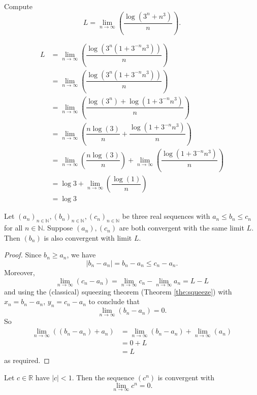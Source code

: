 \begin{example}
    Compute \[L=\lim_{n\to\infty}\left(\dfrac{\log(3^n+n^3)}{n}\right).\]
    
    \begin{align*}
        L&=\lim_{n\to\infty}\left(\dfrac{\log(3^n(1+3^{-n}n^3))}{n}\right)\\
        &=\lim_{n\to\infty}\left(\dfrac{\log(3^n(1+3^{-n}n^3))}{n}\right)\\
        &=\lim_{n\to\infty}\left(\dfrac{\log(3^n)+\log(1+3^{-n}n^3)}{n}\right)\\
        &=\lim_{n\to\infty}\left(\dfrac{n\log(3)}{n}+\dfrac{\log(1+3^{-n}n^3)}{n}\right)\\
        &=\lim_{n\to\infty}\left(\dfrac{n\log(3)}{n}\right)+\lim_{n\to\infty}\left(\dfrac{\log(1+3^{-n}n^3)}{n}\right)\tag{By COLT}\\
        &=\log3+\lim_{n\to\infty}\left(\dfrac{\log(1)}{n}\right)\tag{Exponentials beat powers}\\
        &=\log3
    \end{align*}
\end{example}

\begin{corollary}
    Let $(a_n)_{n\in\mathbb N},(b_n)_{n\in\mathbb N},(c_n)_{n\in\mathbb N}$ be three real sequences with $a_n\leq b_n\leq c_n$ for all $n\in\mathbb N$. Suppose $(a_n),(c_n)$ are both convergent with the same limit $L$. Then $(b_n)$ is also convergent with limit $L$.
\end{corollary}

\begin{proof}
    Since $b_n\geq a_n$, we have \[|b_n-a_n|=b_n-a_n\leq c_n-a_n.\] Moreover, \[\lim_{n\to\infty}(c_n-a_n)=\lim_{n\to\infty}c_n-\lim_{n\to\infty}a_n=L-L\] and using the (classical) squeezing theorem (Theorem \ref{the:squeeze}) with $x_n=b_n-a_n$, $y_n=c_n-a_n$ to conclude that \[\lim_{n\to\infty}(b_n-a_n)=0.\] So 
    \begin{align*}
        \lim_{n\to\infty}((b_n-a_n)+a_n)&=\lim_{n\to\infty}(b_n-a_n)+\lim_{n\to\infty}(a_n)\\
        &=0+L\\
        &=L
    \end{align*}
    as required.
\end{proof}

\begin{theorem}
    Let $c\in\mathbb R$ have $|c|<1$. Then the sequence $(c^n)$ is convergent with \[\lim_{n\to\infty}c^n=0.\]
\end{theorem}

